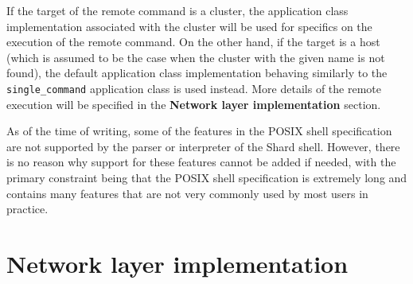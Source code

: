 \documentclass[twoside]{report}
\newcommand{\todoi}[1]{\todo[inline, color=blue!20]{TODO: {#1}}}
\begin{document}
If the target of the remote command is a cluster, the application class implementation associated with the cluster will be used for specifics on the execution of the remote command.
On the other hand, if the target is a host (which is assumed to be the case when the cluster with the given name is not found), the default application class implementation behaving similarly to the \texttt{single\_command} application class is used instead.
More details of the remote execution will be specified in the \textbf{Network layer implementation} section.


As of the time of writing, some of the features in the POSIX shell specification are not supported by the parser or interpreter of the Shard shell.
However, there is no reason why support for these features cannot be added if needed, with the primary constraint being that the POSIX shell specification is extremely long and contains many features that are not very commonly used by most users in practice.

\section{Network layer implementation}

\end{document}

